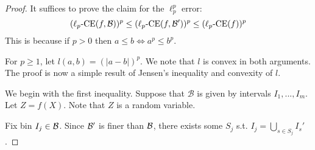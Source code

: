 \begin{proof}
It suffices to prove the claim for the $\ell_p^p$ error:
\[ (\ell_p\mbox{-CE}(f, \mathcal{B}{}))^p \leq (\ell_p\mbox{-CE}(f, \mathcal{B}{}'))^p \leq (\ell_p\mbox{-CE}(f))^p \]
This is because if $p > 0$ then $a \leq b \Leftrightarrow a^p \leq b^p$.

For $p \geq 1$, let $l(a, b) = (|a - b|)^p$.
We note that $l$ is convex in both arguments.
The proof is now a simple result of Jensen's inequality and convexity of $l$.

We begin with the first inequality. Suppose that $\mathcal{B}$ is given by intervals $I_1, ..., I_m$. Let $Z = f(X)$. Note that $Z$ is a random variable.



Fix bin $I_j \in \mathcal{B}{}$.
Since $\mathcal{B}{}'$ is finer than $\mathcal{B}{}$, there exists some $S_j$ s.t. $I_j = \bigcup_{s \in S_j} I_s'$.


\end{proof}
